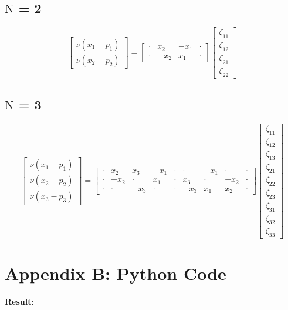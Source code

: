 \documentclass{article}
\begin{document}
\subsection*{$\bm{\mathrm{N}}$ = 2}
\begin{equation}
\left[\begin{array}{c}
\nu (x_1 - p_1) \\
\nu (x_2 - p_2) 
\end{array}\right]
= 
\left[\begin{array}{cccc}
\cdot &  x_2  & -x_1  & \cdot \\
\cdot & -x_2  &  x_1  & \cdot
\end{array}\right]
\left[\begin{array}{c}
\zeta_{11} \\ \zeta_{12} \\ \zeta_{21} \\ \zeta_{22}
\end{array}\right]
\end{equation}
\subsection*{$\bm{\mathrm{N}}$ = 3}
\begin{equation}
\left[\begin{array}{c}
\nu (x_1 - p_1) \\
\nu (x_2 - p_2) \\
\nu (x_3 - p_3) 
\end{array}\right]
= 
\left[\begin{array}{ccccccccc}
\cdot &  x_2  &  x_3  & -x_1  & \cdot & \cdot & -x_1  & \cdot & \cdot \\
\cdot & -x_2  & \cdot &  x_1  & \cdot &  x_3  & \cdot & -x_2  & \cdot \\
\cdot & \cdot & -x_3  & \cdot & \cdot & -x_3  &  x_1  &  x_2  & \cdot 
\end{array}\right]
\left[\begin{array}{c}
\zeta_{11} \\ \zeta_{12} \\ \zeta_{13} \\ \zeta_{21} \\ \zeta_{22} \\ \zeta_{23} \\ \zeta_{31} \\ \zeta_{32} \\ \zeta_{33}
\end{array}\right]
\end{equation}
\clearpage\section*{Appendix B: Python Code}\label{ap:code}

\textbf{Result}:

\end{document}
